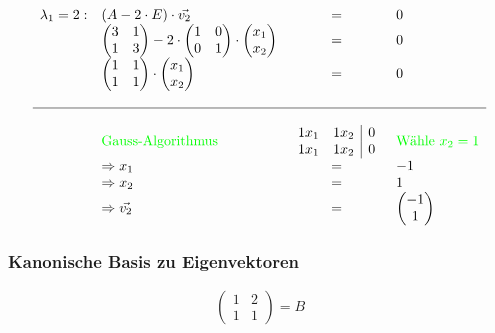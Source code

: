 \[
\begin{array}{llcl}
 \lambda_1 = 2: & (A - 2\cdot E) \cdot \vec{v_2} & = & 0 
 \\ 
  &\begin{pmatrix}
     3 & 1 \\
     1 & 3 \\
  \end{pmatrix} - 2 \cdot 
  \begin{pmatrix}
   1 & 0 \\
   0 & 1 \\
  \end{pmatrix} \cdot
  \begin{pmatrix}
   x_1 \\
   x_2 \\
  \end{pmatrix} & = & 0
\\
  &\begin{pmatrix}
     1 & 1 \\
     1 & 1 \\
  \end{pmatrix} \cdot
  \begin{pmatrix}
   x_1 \\
   x_2 \\
  \end{pmatrix} & = & 0
\\
\\ \hline
\\
  &\color{green}{\text{Gauss-Algorithmus}}
  &\begin{array}{rr|r}
  1x_1 & 1x_2 & 0 \\
  1x_1 & 1x_2 & 0 \\
  \end {array} & \color{green}{\text{Wähle }x_2=1}
\\
  &\Rightarrow
  x_1 & = &  -1
\\
  &\Rightarrow
   x_2 & = & 1
\\
  &\Rightarrow
   \vec{v_2} & = & \begin{pmatrix} -1 \\ 1 \end{pmatrix}
\end{array}
\]
\subsubsection{Kanonische Basis zu Eigenvektoren}
\[
\begin{pmatrix}
  1 & 2 \\
  1 & 1
\end{pmatrix} = B
\]

